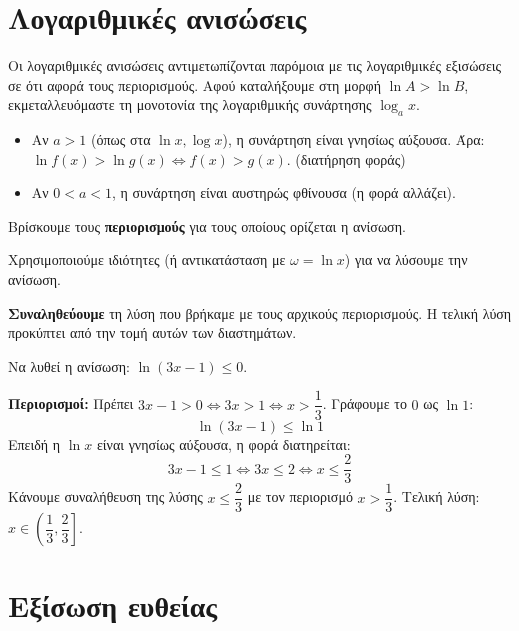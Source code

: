\section{Λογαριθμικές ανισώσεις}

Οι λογαριθμικές ανισώσεις αντιμετωπίζονται παρόμοια με τις λογαριθμικές εξισώσεις σε ότι αφορά τους περιορισμούς. Αφού καταλήξουμε στη μορφή $\ln A > \ln B$, εκμεταλλευόμαστε τη μονοτονία της λογαριθμικής συνάρτησης $\log_a x$.
\begin{itemize}
    \item Αν ${a > 1}$ (όπως στα $\ln x, \log x$), η συνάρτηση είναι γνησίως αύξουσα. Άρα: $\ln f(x) > \ln g(x) \Leftrightarrow f(x) > g(x)$. ({διατήρηση φοράς})
    \item Αν ${0 < a < 1}$, η συνάρτηση είναι αυστηρώς φθίνουσα (η φορά αλλάζει).
\end{itemize}

\bhmata
\begin{bhma}
    \item Βρίσκουμε τους \textbf{περιορισμούς} για τους οποίους ορίζεται η ανίσωση.
    \item Χρησιμοποιούμε ιδιότητες (ή αντικατάσταση με $\omega = \ln x$) για να λύσουμε την ανίσωση.
    \item \textbf{Συναληθεύουμε} τη λύση που βρήκαμε με τους αρχικούς περιορισμούς. Η τελική λύση προκύπτει από την τομή αυτών των διαστημάτων.
\end{bhma}


Να λυθεί η ανίσωση: $\ln(3x - 1) \leq 0$.

\lysh
\textbf{Περιορισμοί:}
Πρέπει $3x - 1 > 0 \Leftrightarrow 3x > 1 \Leftrightarrow x > \dfrac{1}{3}$.
Γράφουμε το $0$ ως $\ln 1$:
\[ \ln(3x - 1) \leq \ln 1 \]
Επειδή η $\ln x$ είναι γνησίως αύξουσα, η φορά διατηρείται:
\[ 3x - 1 \leq 1 \Leftrightarrow 3x \leq 2 \Leftrightarrow x \leq \dfrac{2}{3} \]
Κάνουμε συναλήθευση της λύσης $x \leq \dfrac{2}{3}$ με τον περιορισμό $x > \dfrac{1}{3}$.
Τελική λύση: $x \in \left(\dfrac{1}{3}, \dfrac{2}{3}\right]$.

\section{Εξίσωση ευθείας}

